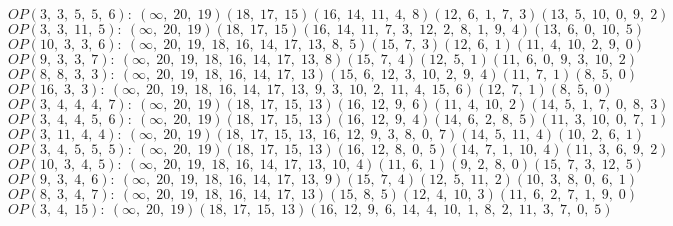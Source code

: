 $OP(3, \;3, \;5, \;5, \;6): \:(\infty, \;20, \;19)(18, \;17, \;15)(16, \;14, \;11, \;4, \;8)(12, \;6, \;1, \;7, \;3)(13, \;5, \;10, \;0, \;9, \;2)$\\
$OP(3, \;3, \;11, \;5): \:(\infty, \;20, \;19)(18, \;17, \;15)(16, \;14, \;11, \;7, \;3, \;12, \;2, \;8, \;1, \;9, \;4)(13, \;6, \;0, \;10, \;5)$\\
$OP(10, \;3, \;3, \;6): \:(\infty, \;20, \;19, \;18, \;16, \;14, \;17, \;13, \;8, \;5)(15, \;7, \;3)(12, \;6, \;1)(11, \;4, \;10, \;2, \;9, \;0)$\\
$OP(9, \;3, \;3, \;7): \:(\infty, \;20, \;19, \;18, \;16, \;14, \;17, \;13, \;8)(15, \;7, \;4)(12, \;5, \;1)(11, \;6, \;0, \;9, \;3, \;10, \;2)$\\
$OP(8, \;8, \;3, \;3): \:(\infty, \;20, \;19, \;18, \;16, \;14, \;17, \;13)(15, \;6, \;12, \;3, \;10, \;2, \;9, \;4)(11, \;7, \;1)(8, \;5, \;0)$\\
$OP(16, \;3, \;3): \:(\infty, \;20, \;19, \;18, \;16, \;14, \;17, \;13, \;9, \;3, \;10, \;2, \;11, \;4, \;15, \;6)(12, \;7, \;1)(8, \;5, \;0)$\\
$OP(3, \;4, \;4, \;4, \;7): \:(\infty, \;20, \;19)(18, \;17, \;15, \;13)(16, \;12, \;9, \;6)(11, \;4, \;10, \;2)(14, \;5, \;1, \;7, \;0, \;8, \;3)$\\
$OP(3, \;4, \;4, \;5, \;6): \:(\infty, \;20, \;19)(18, \;17, \;15, \;13)(16, \;12, \;9, \;4)(14, \;6, \;2, \;8, \;5)(11, \;3, \;10, \;0, \;7, \;1)$\\
$OP(3, \;11, \;4, \;4): \:(\infty, \;20, \;19)(18, \;17, \;15, \;13, \;16, \;12, \;9, \;3, \;8, \;0, \;7)(14, \;5, \;11, \;4)(10, \;2, \;6, \;1)$\\
$OP(3, \;4, \;5, \;5, \;5): \:(\infty, \;20, \;19)(18, \;17, \;15, \;13)(16, \;12, \;8, \;0, \;5)(14, \;7, \;1, \;10, \;4)(11, \;3, \;6, \;9, \;2)$\\
$OP(10, \;3, \;4, \;5): \:(\infty, \;20, \;19, \;18, \;16, \;14, \;17, \;13, \;10, \;4)(11, \;6, \;1)(9, \;2, \;8, \;0)(15, \;7, \;3, \;12, \;5)$\\
$OP(9, \;3, \;4, \;6): \:(\infty, \;20, \;19, \;18, \;16, \;14, \;17, \;13, \;9)(15, \;7, \;4)(12, \;5, \;11, \;2)(10, \;3, \;8, \;0, \;6, \;1)$\\
$OP(8, \;3, \;4, \;7): \:(\infty, \;20, \;19, \;18, \;16, \;14, \;17, \;13)(15, \;8, \;5)(12, \;4, \;10, \;3)(11, \;6, \;2, \;7, \;1, \;9, \;0)$\\
$OP(3, \;4, \;15): \:(\infty, \;20, \;19)(18, \;17, \;15, \;13)(16, \;12, \;9, \;6, \;14, \;4, \;10, \;1, \;8, \;2, \;11, \;3, \;7, \;0, \;5)$\\
